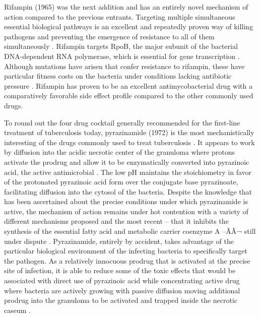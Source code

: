 Rifampin (1965) was the next addition and has an entirely novel mechanism of action compared to the previous entrants. Targeting multiple simultaneous essential biological pathways is an excellent and repeatedly proven way of killing pathogens and preventing the emergence of resistance to all of them simultaneously \citep{Pletz2017}. Rifampin targets RpoB, the major subunit of the bacterial DNA-dependent RNA polymerase, which is essential for gene transcription \citep{Wehrli1983}. Although mutations have arisen that confer resistance to rifampin, these have particular fitness costs on the bacteria under conditions lacking antibiotic pressure \citep{Mariam2004, Xu2021, Gagneux2006b, Billington1999, Gagneux2009}. Rifampin has proven to be an excellent antimycobacterial drug with a comparatively favorable side effect profile compared to the other commonly used drugs.

To round out the four drug cocktail generally recommended for the first-line treatment of tuberculosis today, pyrazinamide (1972) is the most mechanistically interesting of the drugs commonly used to treat tuberculosis \citep{Yeager1952, Steele1988, Millard2019}. It appears to work by diffusion into the acidic necrotic center of the granuloma where protons activate the prodrug and allow it to be enzymatically converted into pyrazinoic acid, the active antimicrobial \citep{Zhang2013, Zhang2019, Kalinda2012, Lamont2020, Lamont2019}. The low pH maintains the stoichiometry in favor of the protonated pyrazinoic acid form over the conjugate base pyrazinoate, facilitating diffusion into the cytosol of the bacteria. Despite the knowledge that has been ascertained about the precise conditions under which pyrazinamide is active, the mechanism of action remains under hot contention with a variety of different mechanisms proposed and the most recent -- that it inhibits the synthesis of the essential fatty acid and metabolic carrier coenzyme A --ÃÃ¬ still under dispute \citep{Kalinda2012, Shi2011, Lamont2020, Dillon2017}. Pyrazinamide, entirely by accident, takes advantage of the particular biological environment of the infecting bacteria to specifically target the pathogen. As a relatively innocuous prodrug that is activated at the precise site of infection, it is able to reduce some of the toxic effects that would be associated with direct use of pyrazinoic acid while concentrating active drug where bacteria are actively growing with passive diffusion moving additional prodrug into the granuloma to be activated and trapped inside the necrotic caseum \citep{Wade2004, Gopal2016}.

